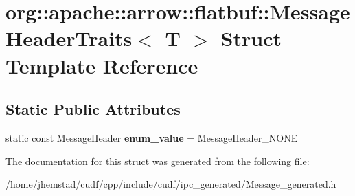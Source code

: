 \hypertarget{structorg_1_1apache_1_1arrow_1_1flatbuf_1_1MessageHeaderTraits}{}\section{org\+:\+:apache\+:\+:arrow\+:\+:flatbuf\+:\+:Message\+Header\+Traits$<$ T $>$ Struct Template Reference}
\label{structorg_1_1apache_1_1arrow_1_1flatbuf_1_1MessageHeaderTraits}
\subsection*{Static Public Attributes}
\begin{DoxyCompactItemize}
\item 
static const Message\+Header {\bfseries enum\+\_\+value} = Message\+Header\+\_\+\+N\+O\+NE\hypertarget{structorg_1_1apache_1_1arrow_1_1flatbuf_1_1MessageHeaderTraits_a90e02f6fea259e7f98ed21f96449ec69}{}\label{structorg_1_1apache_1_1arrow_1_1flatbuf_1_1MessageHeaderTraits_a90e02f6fea259e7f98ed21f96449ec69}

\end{DoxyCompactItemize}


The documentation for this struct was generated from the following file\+:\begin{DoxyCompactItemize}
\item 
/home/jhemstad/cudf/cpp/include/cudf/ipc\+\_\+generated/Message\+\_\+generated.\+h\end{DoxyCompactItemize}
